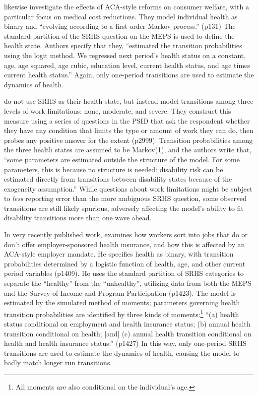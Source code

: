 \documentclass[12pt,pdftex,letterpaper]{article}
\begin{document}
\cite{Ferreira17} likewise investigate the effects of ACA-style reforms on consumer welfare, with a particular focus on medical cost reductions.  They model individual health as binary and ``evolving according to a first-order Markov process.'' (p131)  The standard partition of the SRHS question on the MEPS is used to define the health state.  Authors specify that they, ``estimated the transition probabilities using the logit method.  We regressed next period's health status on a constant, age, age squared, age cubic, education level, current health status, and age times current health status.''  Again, only one-period transitions are used to estimate the dynamics of health.

\cite{LowPistaferri15} do not use SRHS as their health state, but instead model transitions among three levels of work limitations: none, moderate, and severe.  They construct this measure using a series of questions in the PSID that ask the respondent whether they have any condition that limits the type or amount of work they can do, then probes any positive answer for the extent (p2999).  Transition probabilities among the three health states are assumed to be Markov(1), and the authors write that, ``some parameters are estimated outside the structure of the model.  For some parameters, this is because no structure is needed: disability risk can be estimated directly from transitions between disability states because of the exogeneity assumption.''  While questions about work limitations might be subject to \textit{less} reporting error than the more ambiguous SRHS question, some observed transitions are still likely spurious, adversely affecting the model's ability to fit disability transitions more than one wave ahead.

In very recently published work, \cite{Aizawa19} examines how workers sort into jobs that do or don't offer employer-sponsored health insurance, and how this is affected by an ACA-style employer mandate.  He specifies health as binary, with transition probabilities determined by a logistic function of health, age, and other current period variables (p1409).  He uses the standard partition of SRHS categories to separate the ``healthy'' from the ``unhealthy'', utilizing data from both the MEPS and the Survey of Income and Program Participation (p1423).  The model is estimated by the simulated method of moments; parameters governing health transition probabilities are identified by three kinds of moments:\footnote{All moments are also conditional on the individual's age.} ``(a) health status conditional on employment and health insurance status; (b) annual health transition conditional on health; [and] (c) annual health transition conditional on health and health insurance status.'' (p1427) In this way, only one-period SRHS transitions are used to estimate the dynamics of health, causing the model to badly match longer run transitions.
\end{document}

